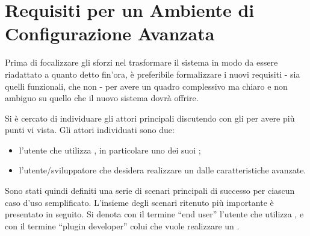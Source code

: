\section{Requisiti per un Ambiente di Configurazione Avanzata}
Prima di focalizzare gli sforzi nel trasformare il sistema in modo da essere riadattato a quanto detto fin'ora, è preferibile formalizzare i nuovi requisiti - sia quelli funzionali, che non - per avere un quadro complessivo ma chiaro e non ambiguo su quello che il nuovo sistema dovrà offrire. 

Si è cercato di individuare gli attori principali discutendo con gli \stakeholders{} per avere più punti vi vista. Gli attori individuati sono due:
\begin{itemize}
\item l'utente che utilizza \visualnetkit{}, in particolare uno dei suoi \plugin{};
\item l'utente/sviluppatore che desidera realizzare un \plugin{} dalle caratteristiche avanzate.
\end{itemize}
Sono stati quindi definiti una serie di scenari principali di successo per ciascun caso d'uso semplificato. L'insieme degli scenari ritenuto più importante è presentato in seguito. Si denota con il termine ``end user'' l'utente che utilizza \visualnetkit{}, e con il termine ``plugin developer'' colui che vuole realizzare un \plugin{}.

